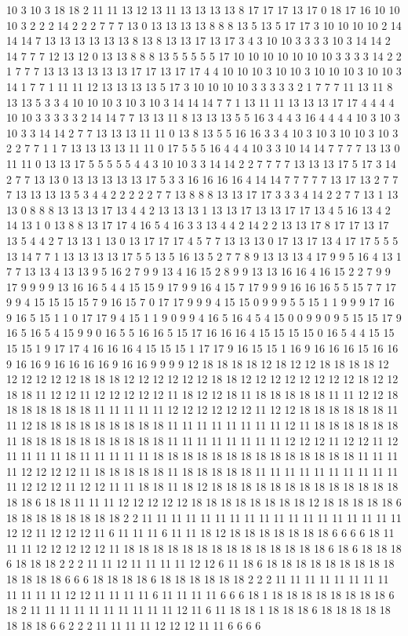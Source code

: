 10 3 10 3 18 18 2 11 11 13 12 13 11 13 13 13 13 8 17 17 17 13 17 0 18 17 16 10 10 10 3 2 2 2 14 2 2 2 7 7 7 13 0 13 13 13 13 8 8 8 13 5 13 5 17 17 3 10 10 10 10 2 14 14 14 7 13 13 13 13 13 13 8 13 8 13 13 17 13 17 3 4 3 10 10 3 3 3 3 10 3 14 14 2 14 7 7 7 12 13 12 0 13 13 8 8 8 13 5 5 5 5 5 17 10 10 10 10 10 10 10 3 3 3 3 14 2 2 1 7 7 7 13 13 13 13 13 13 17 17 13 17 17 4 4 10 10 10 3 10 10 3 10 10 10 3 10 10 3 14 1 7 7 1 11 11 12 13 13 13 13 5 17 3 10 10 10 10 3 3 3 3 3 2 1 7 7 7 11 13 11 8 13 13 5 3 3 4 10 10 10 3 10 3 10 3 14 14 14 7 7 1 13 11 11 13 13 13 17 17 4 4 4 4 10 10 3 3 3 3 3 2 14 14 7 7 13 13 11 8 13 13 13 5 5 16 3 4 4 3 16 4 4 4 4 10 3 10 3 10 3 3 14 14 2 7 7 13 13 13 11 11 0 13 8 13 5 5 16 16 3 3 4 10 3 10 3 10 10 3 10 3 2 2 7 7 1 1 7 13 13 13 13 11 11 0 17 5 5 5 16 4 4 4 10 3 3 10 14 14 7 7 7 7 13 13 0 11 11 0 13 13 17 5 5 5 5 5 4 4 3 10 10 3 3 14 14 2 2 7 7 7 7 13 13 13 17 5 17 3 14 2 7 7 13 13 0 13 13 13 13 13 17 5 3 3 16 16 16 16 4 14 14 7 7 7 7 7 13 17 13 2 7 7 7 13 13 13 13 5 3 4 4 2 2 2 2 2 7 7 13 8 8 8 13 13 17 17 3 3 3 4 14 2 2 7 7 13 1 13 13 0 8 8 8 13 13 13 17 13 4 4 2 13 13 13 1 13 13 17 13 13 17 17 13 4 5 16 13 4 2 14 13 1 0 13 8 8 13 17 17 4 16 5 4 16 3 3 13 4 4 2 14 2 2 13 13 17 8 17 17 13 17 13 5 4 4 2 7 13 13 1 13 0 13 17 17 17 4 5 7 7 13 13 13 0 17 13 17 13 4 17 17 5 5 5 13 14 7 7 1 13 13 13 13 17 5 5 13 5 16 13 5 2 7 7 8 9 13 13 13 4 17 9 9 5 16 4 13 1 7 7 13 13 4 13 13 9 5 16 2 7 9 9 13 4 16 15 2 8 9 9 13 13 16 16 4 16 15 2 2 7 9 9 17 9 9 9 9 13 16 16 5 4 4 15 15 9 17 9 9 16 4 15 7 17 9 9 9 16 16 16 5 5 15 7 7 17 9 9 4 15 15 15 15 7 9 16 15 7 0 17 17 9 9 9 4 15 15 0 9 9 9 5 5 15 1 1 9 9 9 17 16 9 16 5 15 1 1 0 17 17 9 4 15 1 1 9 0 9 9 4 16 5 16 4 5 4 15 0 0 9 9 0 9 5 15 15 17 9 16 5 16 5 4 15 9 9 0 16 5 5 16 16 5 15 17 16 16 16 4 15 15 15 15 0 16 5 4 4 15 15 15 15 1 9 17 17 4 16 16 16 4 15 15 15 1 17 17 9 16 15 15 1 16 9 16 16 16 15 16 16 9 16 16 9 16 16 16 16 9 16 16 9 9 9 9 12 18 18 18 18 12 18 12 12 18 18 18 18 12 12 12 12 12 12 18 18 18 12 12 12 12 12 12 18 18 12 12 12 12 12 12 12 12 18 12 12 18 18 11 12 12 11 12 12 12 12 12 11 18 12 12 18 11 18 18 18 18 18 11 11 12 12 18 18 18 18 18 18 18 11 11 11 11 11 12 12 12 12 12 12 11 12 12 18 18 18 18 18 18 11 11 12 18 18 18 18 18 18 18 18 18 11 11 11 11 11 11 11 11 12 11 18 18 18 18 18 18 11 18 18 18 18 18 18 18 18 18 18 11 11 11 11 11 11 11 11 12 12 12 11 12 12 11 12 11 11 11 11 18 11 11 11 11 11 18 18 18 18 18 18 18 18 18 18 18 18 18 18 11 11 11 11 12 12 12 12 11 18 18 18 18 18 11 18 18 18 18 18 11 11 11 11 11 11 11 11 11 11 11 12 12 12 11 12 12 11 11 18 18 11 18 12 18 18 18 18 18 18 18 18 18 18 18 18 18 18 18 6 18 18 11 11 11 12 12 12 12 12 18 18 18 18 18 18 18 18 12 18 18 18 18 18 6 18 18 18 18 18 18 18 18 2 2 11 11 11 11 11 11 11 11 11 11 11 11 11 11 11 11 11 11 12 12 11 12 12 12 11 6 11 11 11 6 11 11 18 12 18 18 18 18 18 18 18 6 6 6 6 18 11 11 11 12 12 12 12 12 11 18 18 18 18 18 18 18 18 18 18 18 18 18 18 6 18 6 18 18 18 6 18 18 18 2 2 2 11 11 12 11 11 11 11 12 12 6 11 18 6 18 18 18 18 18 18 18 18 18 18 18 18 18 6 6 6 18 18 18 18 6 18 18 18 18 18 18 2 2 2 11 11 11 11 11 11 11 11 11 11 11 11 12 12 11 11 11 11 6 11 11 11 11 6 6 6 18 1 18 18 18 18 18 18 18 18 6 18 2 11 11 11 11 11 11 11 11 11 11 12 11 6 11 18 18 1 18 18 18 6 18 18 18 18 18 18 18 18 6 6 2 2 2 11 11 11 11 12 12 12 11 11 6 6 6 6 